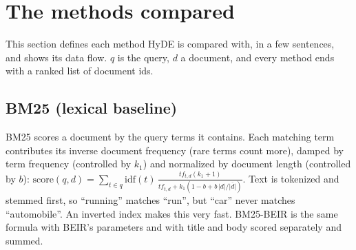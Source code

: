 \section{The methods compared}\label{sec:methods}
This section defines each method HyDE is compared with, in a few sentences, and shows its data flow. $q$ is the query, $d$
a document, and every method ends with a ranked list of document ids.

\subsection{BM25 (lexical baseline)~\cite{kamphuis2020bm25,thakur2021beir}}
BM25 scores a document by the query terms it contains. Each matching term contributes its inverse
document frequency (rare terms count more), damped by term frequency (controlled by $k_1$) and
normalized by document length (controlled by $b$):
$\mathrm{score}(q,d)=\sum_{t\in q}\mathrm{idf}(t)\,\frac{tf_{t,d}(k_1+1)}{tf_{t,d}+k_1(1-b+b\,|d|/\overline{|d|})}$.
Text is tokenized and stemmed first, so ``running'' matches ``run'', but ``car'' never matches
``automobile''. An inverted index makes this very fast. BM25-BEIR is the same formula with BEIR's
parameters and with title and body scored separately and summed.
\begin{center}\end{center}

